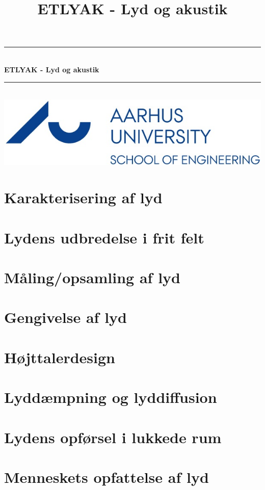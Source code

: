 \documentclass[12pt,a4paper,danish]{book}
\title{ETLYAK - Lyd og akustik}
\newcommand{\HRule}{\rule{\linewidth}{0.5mm}}
\begin{document}
\begin{titlepage}
	\clearpage\thispagestyle{empty}

	\begin{center}
		\HRule \\[0.4cm]
		{\huge \bfseries ETLYAK - Lyd og akustik}\\[0cm]
		\HRule \\[3.4cm]
		\includegraphics[width=0.5\linewidth]{graphics/au}
	\end{center}
	\renewcommand{\contentsname}{Indholdsfortegnelse}
	\tableofcontents

\end{titlepage}
 

\chapter{Karakterisering af lyd}



\chapter{Lydens udbredelse i frit felt}


\chapter{Måling/opsamling af lyd}


\chapter{Gengivelse af lyd}


\chapter{Højttalerdesign}


\chapter{Lyddæmpning og lyddiffusion}


\chapter{Lydens opførsel i lukkede rum}

\chapter{Menneskets opfattelse af lyd}
\end{document}
